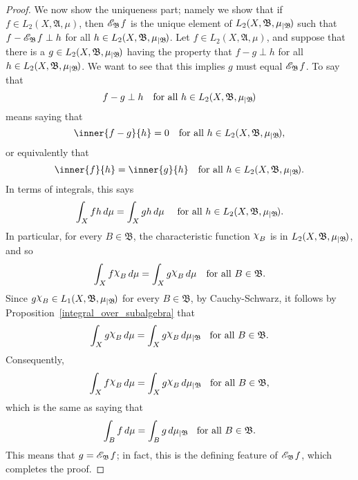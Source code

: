\documentclass[
twoside=true,
paper=letter,
fontsize=11pt,
pagesize=auto,
leqno,
openany,
headsepline,
overfullrule,
]{scrbook}
\theoremstyle{plain}
\theoremstyle{plain}
\theoremstyle{definition}
\theoremstyle{bfnoteitalic}
\theoremstyle{bfnoteroman}
\newcommand{\sigalg}[1]{\mathfrak{#1}}
\newcommand{\cali}[1]{\mathscr{#1}}
\newcommand{\condexpsub}[2]
{\mathop{\cali{E}\hspace{-1.5pt}}\nolimits_{#2}\hspace{-1pt}#1}
\newcommand{\charfunction}[1]{{\raisebox{2pt}{$\chi$}}_{#1}}
\newcommand{\restrictedto}[1]{_{\lvert#1}\kern-1.5pt}
\newcommand{\sigmaalgebra}{\sigalg{A}}
\newcommand{\sigmaalgebraii}{\sigalg{B}}
\newcommand{\function}{f}
\newcommand{\functionii}{g}
\newcommand{\functioniii}{h}
\newcommand{\measurespace}{X}
\newcommand{\measure}{\mu}
\begin{document}
\begin{proof}
We now show the uniqueness part; namely we show that if
$\function\in L_2(\measurespace, \sigmaalgebra,\measure)$, then 
$\condexpsub{\function}{\sigmaalgebraii}$ is the
unique element of 
$L_2(\measurespace, \sigmaalgebraii,\measure\restrictedto{\sigmaalgebraii})$
such that 
$\function - \condexpsub{\function}{\sigmaalgebraii} \perp \functioniii$ for all $\functioniii\in
L_2(\measurespace, \sigmaalgebraii,\measure\restrictedto{\sigmaalgebraii})$.
Let
$\function\in L_2(\measurespace, \sigmaalgebra,\measure)$,
and suppose that there is a 
$\functionii \in L_2(\measurespace, \sigmaalgebraii,\measure\restrictedto{\sigmaalgebraii})$
having the property that
$\function-\functionii\perp \functioniii$ for all $\functioniii\in
L_2(\measurespace, \sigmaalgebraii,\measure\restrictedto{\sigmaalgebraii})$.
We want to see that this implies $\functionii$ must equal 
$\condexpsub{\function}{\sigmaalgebraii}$.
To say that 
\[
\function-\functionii\perp \functioniii 
\quad\text{for all $\functioniii\in
L_2(\measurespace, \sigmaalgebraii,\measure\restrictedto{\sigmaalgebraii})$}
\]
means saying that 
\[
\inner{\function-\functionii}{\functioniii} = 0 
\quad\text{for all 
$\functioniii\in L_2(\measurespace, \sigmaalgebraii,\measure\restrictedto{\sigmaalgebraii})$},
\]
or equivalently that 
\[
\inner{\function}{\functioniii} = \inner{\functionii}{\functioniii}
\quad\text{for all 
$\functioniii\in L_2(\measurespace, \sigmaalgebraii,\measure\restrictedto{\sigmaalgebraii})$}.
\]
In terms of integrals, this says
\[
\int_\measurespace \function\functioniii \, d\measure
=
\int_\measurespace \functionii\functioniii \, d\measure
\quad\text{ 
for all
$\functioniii\in L_2(\measurespace, \sigmaalgebraii,\measure\restrictedto{\sigmaalgebraii})$}.
\]
In particular, for every $B\in\sigmaalgebraii$, the characteristic function 
$\charfunction{B}$ is in 
$L_2(\measurespace, \sigmaalgebraii,\measure\restrictedto{\sigmaalgebraii})$, and so
\[
\int_\measurespace \function\charfunction{B} \, d\measure
=
\int_\measurespace \functionii\charfunction{B} \, d\measure
\quad\text{for all
$B\in\sigmaalgebraii$}.
\]
Since 
$\functionii\charfunction{B}
\in L_1(\measurespace, \sigmaalgebraii,\measure\restrictedto{\sigmaalgebraii})$ 
for every $B\in\sigmaalgebraii$, by Cauchy-Schwarz,
it follows by Proposition~\ref{integral_over_subalgebra} that
\[
\int_\measurespace \functionii\charfunction{B}\, d\measure
=
\int_\measurespace \functionii\charfunction{B}\, d\measure\restrictedto{\sigmaalgebraii}
\quad\text{for all
$B\in\sigmaalgebraii$}.
\]
Consequently, 
\[
\int_\measurespace \function\charfunction{B} \, d\measure
=
\int_\measurespace \functionii\charfunction{B} \, d\measure\restrictedto{\sigmaalgebraii}
\quad
\text{for all
$B\in\sigmaalgebraii$,}
\]
which is the same as saying that
\[
\int_B \function \, d\measure
=
\int_B \functionii \, d\measure\restrictedto{\sigmaalgebraii}
\quad\text{for all $B\in\sigmaalgebraii$.}
\]
This means that $\functionii = \condexpsub{\function}{\sigmaalgebraii}$;  in fact, this is the defining feature of $\condexpsub{\function}{\sigmaalgebraii}$, which completes the proof.
\end{proof}
\end{document}
